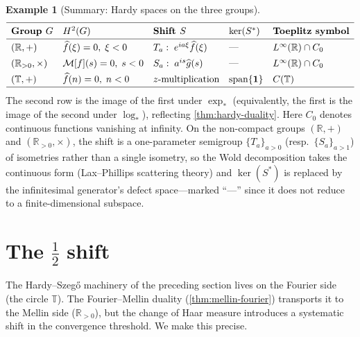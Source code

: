 \documentclass[12pt]{amsart}
\theoremstyle{definition}
\newtheorem{example}[theorem]{Example}
\theoremstyle{remark}
\newcommand{\R}{\mathbb{R}}
\newcommand{\Rpos}{\mathbb{R}_{>0}}
\newcommand{\bT}{\mathbb{T}}
\newcommand{\cM}{\mathcal{M}}
\newcommand{\Htwo}{H^2}
\begin{document}
\begin{example}[Summary: Hardy spaces on the three groups]\label{ex:hardy-summary}
\[
\renewcommand{\arraystretch}{1.4}
\begin{array}{lllll}
\hline
\textbf{Group } G & \Htwo(G) & \textbf{Shift } S & \ker(S^*) & \textbf{Toeplitz symbol} \\
\hline
(\R, +) & \widehat{f}(\xi) = 0,\; \xi < 0 & T_a:\; e^{ia\xi}\widehat{f}(\xi) & \text{---} & L^\infty(\R) \cap C_0 \\
(\Rpos, \times) & \cM[f](s) = 0,\; s < 0 & S_a:\; a^{is}\widehat{g}(s) & \text{---} & L^\infty(\R) \cap C_0 \\
(\bT, +) & \widehat{f}(n) = 0,\; n < 0 & z\text{-multiplication} & \operatorname{span}\{\mathbf{1}\} & C(\bT) \\
\hline
\end{array}
\]
The second row is the image of the first under $\exp_*$ (equivalently, the first is the image of the second under $\log_*$), reflecting \cref{thm:hardy-duality}. Here $C_0$ denotes continuous functions vanishing at infinity. On the non-compact groups $(\R, +)$ and $(\Rpos, \times)$, the shift is a one-parameter semigroup $\{T_a\}_{a > 0}$ (resp.\ $\{S_a\}_{a > 1}$) of isometries rather than a single isometry, so the Wold decomposition takes the continuous form (Lax--Phillips scattering theory) and $\ker(S^*)$ is replaced by the infinitesimal generator's defect space---marked ``---'' since it does not reduce to a finite-dimensional subspace.
\end{example}

\section{The $\frac{1}{2}$ shift}\label{sec:half-shift}

The Hardy--Szeg\H{o} machinery of the preceding section lives on the Fourier side (the circle $\bT$). The Fourier--Mellin duality (\cref{thm:mellin-fourier}) transports it to the Mellin side ($\Rpos$), but the change of Haar measure introduces a systematic shift in the convergence threshold. We make this precise.
\end{document}
